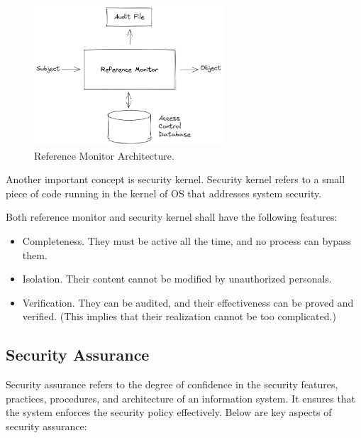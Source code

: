 \begin{figure}[htbp]
	\centering
	\includegraphics[width=200pt]{chapters/ch-computer-security-basics/figures/reference_monitor.png}
	\caption{Reference Monitor Architecture.} \label{ch:ossec:fig:reference_monitor}
\end{figure}

Another important concept is security kernel. Security kernel refers to a small piece of code running in the kernel of OS that addresses system security.

Both reference monitor and security kernel shall have the following features:
\begin{itemize}
  \item Completeness. They must be active all the time, and no process can bypass them.
  \item Isolation. Their content cannot be modified by unauthorized personals.
  \item Verification. They can be audited, and their effectiveness can be proved and verified. (This implies that their realization cannot be too complicated.)
\end{itemize}

\subsection{Security Assurance}

Security assurance refers to the degree of confidence in the security features, practices, procedures, and architecture of an information system. It ensures that the system enforces the security policy effectively. Below are key aspects of security assurance:

